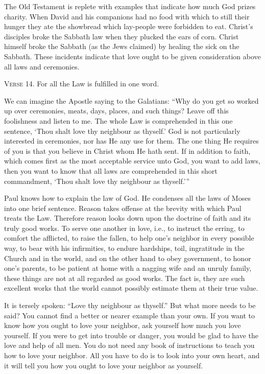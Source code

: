 The Old Testament is replete with examples that indicate how much God prizes charity. When David and his companions had no food with which to still their hunger they ate the showbread which lay-people were forbidden to eat. Christ’s disciples broke the Sabbath law when they plucked the ears of corn. Christ himself broke the Sabbath (as the Jews claimed) by healing the sick on the Sabbath. These incidents indicate that love ought to be given consideration above all laws and ceremonies.

\textsc{Verse} 14. For all the Law is fulfilled in one word.

We can imagine the Apostle saying to the Galatians: “Why do you get so worked up over ceremonies, meats, days, places, and such things? Leave off this foolishness and listen to me. The whole Law is comprehended in this one sentence, ‘Thou shalt love thy neighbour as thyself.’ God is not particularly interested in ceremonies, nor has He any use for them. The one thing He requires of you is that you believe in Christ whom He hath sent. If in addition to faith, which comes first as the most acceptable service unto God, you want to add laws, then you want to know that all laws are comprehended in this short commandment, ‘Thou shalt love thy neighbour as thyself.’”

Paul knows how to explain the law of God. He condenses all the laws of Moses into one brief sentence. Reason takes offense at the brevity with which Paul treats the Law. Therefore reason looks down upon the doctrine of faith and its truly good works. To serve one another in love, i.e., to instruct the erring, to comfort the afflicted, to raise the fallen, to help one’s neighbor in every possible way, to bear with his infirmities, to endure hardships, toil, ingratitude in the Church and in the world, and on the other hand to obey government, to honor one’s parents, to be patient at home with a nagging wife and an unruly family, these things are not at all regarded as good works. The fact is, they are such excellent works that the world cannot possibly estimate them at their true value.

It is tersely spoken: “Love thy neighbour as thyself.” But what more needs to be said? You cannot find a better or nearer example than your own. If you want to know how you ought to love your neighbor, ask yourself how much you love yourself. If you were to get into trouble or danger, you would be glad to have the love and help of all men. You do not need any book of instructions to teach you how to love your neighbor. All you have to do is to look into your own heart, and it will tell you how you ought to love your neighbor as yourself.


